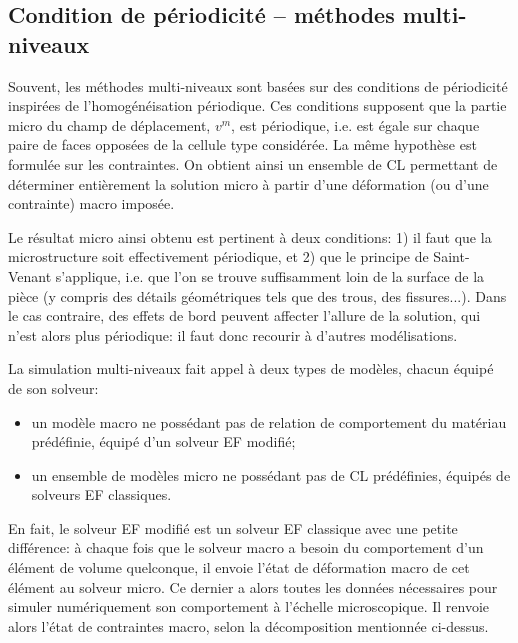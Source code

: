 \medskip
\subsection{Condition de périodicité -- méthodes multi-niveaux}

Souvent, les méthodes multi-niveaux sont basées sur des conditions de périodicité
inspirées de l'homogénéisation périodique.
Ces conditions supposent que la partie micro du champ de déplacement, $v^m$, est périodique,
i.e. est égale sur chaque paire de faces opposées de la cellule type considérée.
La même hypothèse est formulée sur les contraintes.
On obtient ainsi un ensemble de CL permettant de déterminer entièrement la solution micro à
partir d'une déformation (ou d'une contrainte) macro imposée.

Le résultat micro ainsi obtenu est pertinent à deux conditions:
1) il faut que la microstructure soit effectivement périodique, et 2) que le principe de
Saint-Venant
s'applique, i.e. que l'on se trouve suffisamment loin de la surface de la pièce
(y compris des détails géométriques tels que des trous, des fissures...).
Dans le cas contraire, des effets de bord peuvent affecter l'allure de la solution, qui n'est
alors plus périodique: il faut donc recourir à d'autres modélisations.

\medskip
La simulation multi-niveaux fait appel à deux types de modèles, chacun équipé de son solveur:
\begin{itemize}
   \item un modèle macro ne possédant pas de relation de comportement du matériau
	prédéfinie, équipé d'un solveur EF modifié;
   \item un ensemble de modèles micro ne possédant pas de CL prédéfinies,
	équipés de solveurs EF classiques.
\end{itemize}

En fait, le solveur EF modifié est un solveur EF classique avec une petite différence:
à chaque fois que le solveur macro a besoin du comportement d'un élément de volume
quelconque, il envoie l'état de déformation macro de cet élément au solveur micro.
Ce dernier a alors toutes les données nécessaires pour simuler numériquement son comportement
à l'échelle microscopique. Il renvoie alors l'état de contraintes macro, selon la décomposition
mentionnée ci-dessus.

